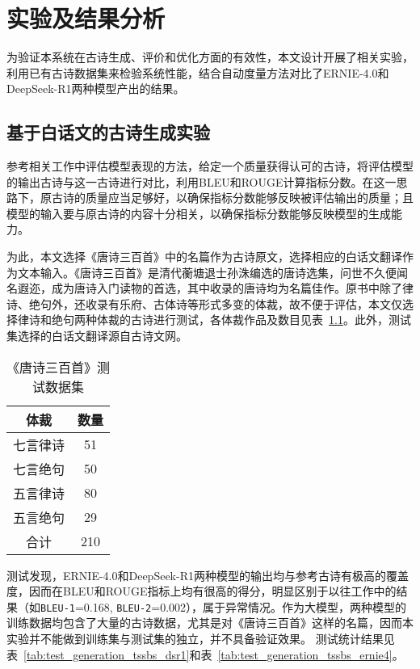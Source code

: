 
\chapter{实验及结果分析}

为验证本系统在古诗生成、评价和优化方面的有效性，本文设计开展了相关实验，利用已有古诗数据集来检验系统性能，结合自动度量方法对比了ERNIE-4.0和DeepSeek-R1两种模型产出的结果。

\section{基于白话文的古诗生成实验}

参考相关工作中评估模型表现的方法，给定一个质量获得认可的古诗，将评估模型的输出古诗与这一古诗进行对比，利用BLEU和ROUGE计算指标分数。在这一思路下，原古诗的质量应当足够好，以确保指标分数能够反映被评估输出的质量；且模型的输入要与原古诗的内容十分相关，以确保指标分数能够反映模型的生成能力。

为此，本文选择《唐诗三百首》中的名篇作为古诗原文，选择相应的白话文翻译作为文本输入。《唐诗三百首》是清代蘅塘退士孙洙编选的唐诗选集，问世不久便闻名遐迩，成为唐诗入门读物的首选，其中收录的唐诗均为名篇佳作。原书中除了律诗、绝句外，还收录有乐府、古体诗等形式多变的体裁，故不便于评估，本文仅选择律诗和绝句两种体裁的古诗进行测试，各体裁作品及数目见表~\ref{tab:test_generation_data}。此外，测试集选择的白话文翻译源自古诗文网。

\begin{table}[ht]
    \centering
    \caption{《唐诗三百首》测试数据集}
    \label{tab:test_generation_data}
    \begin{tabular}{|c|c|}
      \hline
      \bf{体裁}& \bf{数量} \\
      \hline
      七言律诗& 51\\
      \hline
      七言绝句& 50\\
      \hline
      五言律诗& 80\\
      \hline
      五言绝句& 29\\
      \hline
      合计& 210\\
      \hline
    \end{tabular}
  \end{table}

测试发现，ERNIE-4.0和DeepSeek-R1两种模型的输出均与参考古诗有极高的覆盖度，因而在BLEU和ROUGE指标上均有很高的得分，明显区别于以往工作中的结果（如\verb|BLEU-1|=0.168, \verb|BLEU-2|=0.002），属于异常情况。作为大模型，两种模型的训练数据均包含了大量的古诗数据，尤其是对《唐诗三百首》这样的名篇，因而本实验并不能做到训练集与测试集的独立，并不具备验证效果。
测试统计结果见表~\ref{tab:test_generation_tssbs_dsr1}和表~\ref{tab:test_generation_tssbs_ernie4}。


